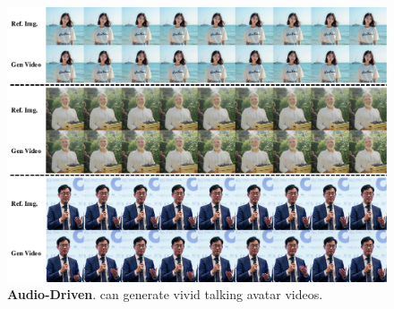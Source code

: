 



\begin{figure}
    \centering
    \includegraphics[width=\linewidth]{applications/app_figures/audio-1.pdf}
    \caption{\textbf{Audio-Driven}. {\nameofmethod} can generate vivid talking avatar videos.}
    \label{fig:application-audio}
\end{figure}


